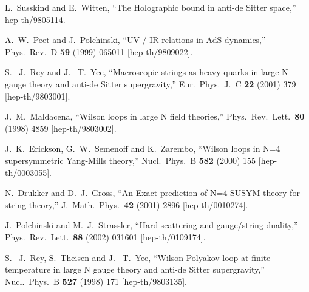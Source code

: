 \begin{thebibliography}{99}

%
%

  L.~Susskind and E.~Witten,
  ``The Holographic bound in anti-de Sitter space,''
  hep-th/9805114.
  
  A.~W.~Peet and J.~Polchinski,
  ``UV / IR relations in AdS dynamics,''
  Phys.\ Rev.\ D {\bf 59} (1999) 065011
  [hep-th/9809022].


  S.~-J.~Rey and J.~-T.~Yee,
  ``Macroscopic strings as heavy quarks in large N gauge theory and anti-de Sitter supergravity,''
  Eur.\ Phys.\ J.\ C {\bf 22} (2001) 379
  [hep-th/9803001].

  J.~M.~Maldacena,
  ``Wilson loops in large N field theories,''
  Phys.\ Rev.\ Lett.\  {\bf 80} (1998) 4859
  [hep-th/9803002].


  J.~K.~Erickson, G.~W.~Semenoff and K.~Zarembo,
  ``Wilson loops in N=4 supersymmetric Yang-Mills theory,''
  Nucl.\ Phys.\ B {\bf 582} (2000) 155
  [hep-th/0003055].

  N.~Drukker and D.~J.~Gross,
  ``An Exact prediction of N=4 SUSYM theory for string theory,''
  J.\ Math.\ Phys.\  {\bf 42} (2001) 2896
  [hep-th/0010274].
  
 
  J.~Polchinski and M.~J.~Strassler,
  ``Hard scattering and gauge/string duality,''
  Phys.\ Rev.\ Lett.\  {\bf 88} (2002) 031601
  [hep-th/0109174].


  S.~-J.~Rey, S.~Theisen and J.~-T.~Yee,
  ``Wilson-Polyakov loop at finite temperature in large N gauge theory and anti-de Sitter supergravity,''
  Nucl.\ Phys.\ B {\bf 527} (1998) 171
  [hep-th/9803135].
  

\end{thebibliography}
